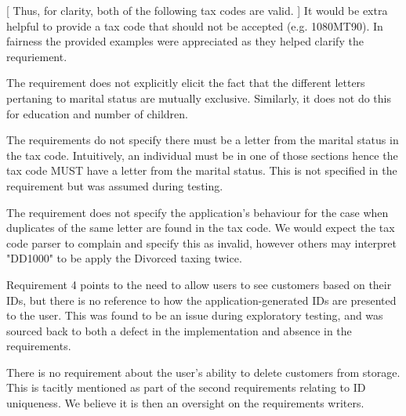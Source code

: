 [ Thus, for clarity, both of the following tax codes are valid. ] 
It would be extra helpful to provide a tax code that should not be accepted (e.g. 1080MT90). In fairness the provided examples were appreciated as they helped clarify the requriement.

The requirement does not explicitly elicit the fact that the different letters pertaning to marital status are mutually exclusive. Similarly, it does not do this for education and number of children. 

The requirements do not specify there must be a letter from the marital status in the tax code. Intuitively, an individual must be in one of those sections hence the tax code MUST have a letter from the marital status. This is not specified in the requirement but was assumed during testing. 

The requirement does not specify the application's behaviour for the case when duplicates of the same letter are found in the tax code. We would expect the tax code parser to complain and specify this as invalid, however others may interpret "DD1000" to be apply the Divorced taxing twice. 




Requirement 4 points to the need to allow users to see customers based on their IDs, but there is no reference to how the application-generated IDs are presented to the user. This was found to be an issue during exploratory testing, and was sourced back to both a defect in the implementation and absence in the requirements. 

There is no requirement about the user's ability to delete customers from storage. This is tacitly mentioned as part of the second requirements relating to ID uniqueness. We believe it is then an oversight on the requirements writers. 







